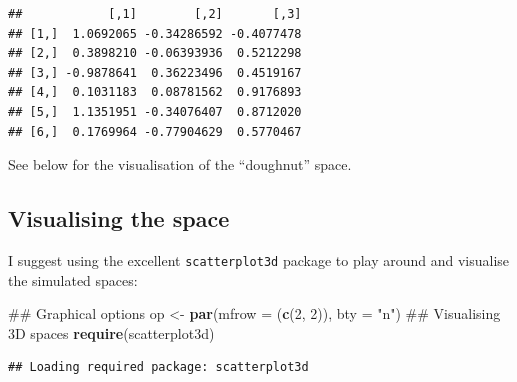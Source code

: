 \documentclass[]{book}
\newenvironment{Shaded}{\begin{snugshade}}{\end{snugshade}}
\newcommand{\KeywordTok}[1]{\textcolor[rgb]{0.13,0.29,0.53}{\textbf{#1}}}
\newcommand{\DataTypeTok}[1]{\textcolor[rgb]{0.13,0.29,0.53}{#1}}
\newcommand{\DecValTok}[1]{\textcolor[rgb]{0.00,0.00,0.81}{#1}}
\newcommand{\StringTok}[1]{\textcolor[rgb]{0.31,0.60,0.02}{#1}}
\newcommand{\NormalTok}[1]{#1}
\theoremstyle{definition}
\theoremstyle{definition}
\theoremstyle{definition}
\theoremstyle{remark}
\begin{document}
\begin{verbatim}
##            [,1]        [,2]       [,3]
## [1,]  1.0692065 -0.34286592 -0.4077478
## [2,]  0.3898210 -0.06393936  0.5212298
## [3,] -0.9878641  0.36223496  0.4519167
## [4,]  0.1031183  0.08781562  0.9176893
## [5,]  1.1351951 -0.34076407  0.8712020
## [6,]  0.1769964 -0.77904629  0.5770467
\end{verbatim}

See below for the visualisation of the ``doughnut'' space.

\subsection{Visualising the space}\label{visualising-the-space}

I suggest using the excellent \texttt{scatterplot3d} package to play
around and visualise the simulated spaces:

\begin{Shaded}
\begin{Highlighting}[]
\NormalTok{## Graphical options}
\NormalTok{op <-}\StringTok{ }\KeywordTok{par}\NormalTok{(}\DataTypeTok{mfrow =}\NormalTok{ (}\KeywordTok{c}\NormalTok{(}\DecValTok{2}\NormalTok{, }\DecValTok{2}\NormalTok{)), }\DataTypeTok{bty =} \StringTok{"n"}\NormalTok{)}
\NormalTok{## Visualising 3D spaces}
\KeywordTok{require}\NormalTok{(scatterplot3d)}
\end{Highlighting}
\end{Shaded}

\begin{verbatim}
## Loading required package: scatterplot3d
\end{verbatim}
\end{document}
